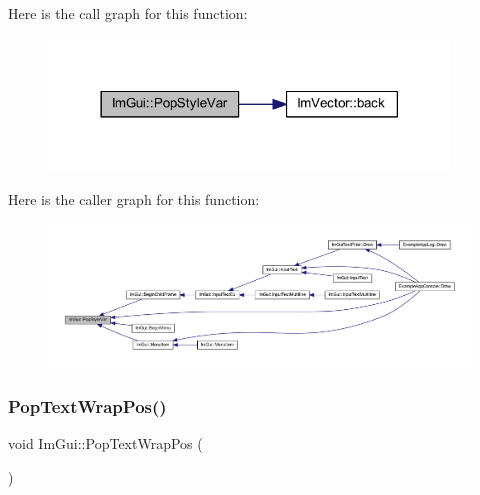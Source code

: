 Here is the call graph for this function\+:
\nopagebreak
\begin{figure}[H]
\begin{center}
\leavevmode
\includegraphics[width=302pt]{namespace_im_gui_a14116e57d81e326adef2a702e65781d4_cgraph}
\end{center}
\end{figure}
Here is the caller graph for this function\+:
\nopagebreak
\begin{figure}[H]
\begin{center}
\leavevmode
\includegraphics[width=350pt]{namespace_im_gui_a14116e57d81e326adef2a702e65781d4_icgraph}
\end{center}
\end{figure}
\mbox{\label{namespace_im_gui_a08000421b9cc13757430efe54178ae0f}} 
\subsubsection{\texorpdfstring{Pop\+Text\+Wrap\+Pos()}{PopTextWrapPos()}}
{\footnotesize\ttfamily void Im\+Gui\+::\+Pop\+Text\+Wrap\+Pos (\begin{DoxyParamCaption}{ }\end{DoxyParamCaption})}

